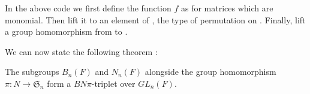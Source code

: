 \begin{commentary}
    In the above code we first define the function $f$ as  for matrices which are monomial. Then  lift it to an element of , the type of permutation on . Finally,  lift  a group homomorphism from  to .
\end{commentary}

We can now state the following theorem :

\begin{theoreme} \label{thm:GL}
    The subgroups $B_n\left( F \right)$ and $N_n\left( F \right)$ alongside the group homomorphism $\pi : N \to \mathfrak{S}_n$ form a $BN\pi$-triplet over $GL_n\left( F \right)$.
\end{theoreme}
